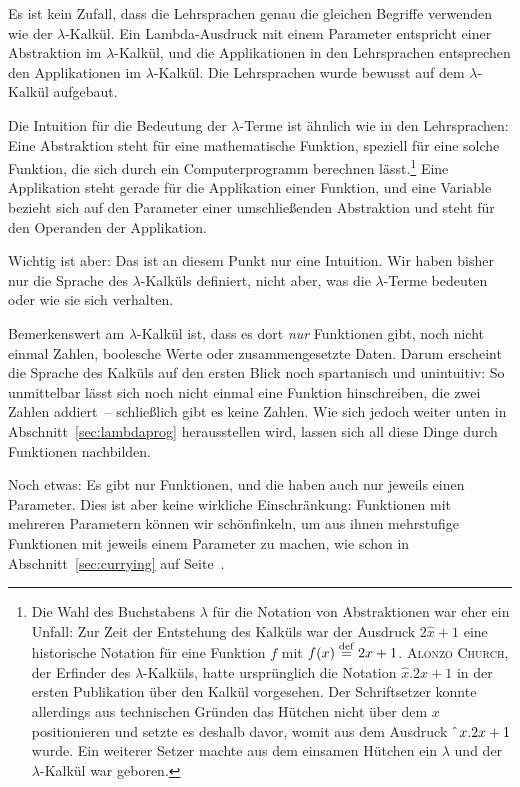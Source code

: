 Es ist kein Zufall, dass die Lehrsprachen genau die gleichen Begriffe verwenden
wie der $\lambda$-Kalkül.  Ein Lambda-Ausdruck mit einem
Parameter entspricht einer Abstraktion im $\lambda$-Kalkül,
und die Applikationen in den Lehrsprachen entsprechen den Applikationen im
$\lambda$-Kalkül.  Die Lehrsprachen wurde bewusst auf dem
$\lambda$-Kalkül aufgebaut.

Die Intuition für die Bedeutung der $\lambda$-Terme ist ähnlich wie in
den Lehrsprachen: Eine Abstraktion steht für eine mathematische Funktion,
speziell für eine solche Funktion, die sich durch ein Computerprogramm
berechnen lässt.\footnote{Die Wahl des Buchstabens $\lambda$ für die
  Notation von Abstraktionen war eher ein Unfall: Zur Zeit der
  Entstehung des Kalküls war der Ausdruck $2\hat{x}+1$ eine historische Notation für eine
  Funktion $f$ mit $f(x)\stackrel{\rm def}{=}{}2x+1$.  \textsc{Alonzo Church},
  der Erfinder des $\lambda$-Kalküls, hatte ursprünglich
  die Notation $\hat{x}.2x+1$ in der ersten Publikation über den
  Kalkül vorgesehen.  Der Schriftsetzer konnte allerdings aus
  technischen Gründen
  das Hütchen nicht über dem $x$ positionieren und setzte es deshalb
  davor, womit aus dem Ausdruck $\hat{~}\thinspace{}x.2x+1$ wurde.  Ein weiterer
  Setzer machte aus dem einsamen Hütchen ein $\lambda$ und der
  $\lambda$-Kalkül war geboren.}  Eine Applikation steht gerade für
die Applikation einer Funktion, und eine Variable bezieht sich auf den
Parameter einer umschließenden Abstraktion und steht für den Operanden
der Applikation.  

Wichtig ist aber: Das ist an diesem Punkt nur eine Intuition.  Wir
haben bisher nur die Sprache des $\lambda$-Kalküls definiert, nicht
aber, was die $\lambda$-Terme bedeuten oder wie sie sich verhalten.

Bemerkenswert am $\lambda$-Kalkül ist, dass es dort \emph{nur}
Funktionen gibt, noch nicht einmal Zahlen, boolesche Werte oder
zusammengesetzte Daten.  Darum erscheint die Sprache des Kalküls auf den
ersten Blick noch spartanisch und unintuitiv: So unmittelbar lässt sich
noch nicht einmal eine Funktion hinschreiben, die zwei Zahlen addiert~--
schließlich gibt es keine Zahlen.  Wie sich jedoch weiter unten in
Abschnitt~\ref{sec:lambdaprog} herausstellen wird, lassen sich all diese
Dinge durch Funktionen nachbilden.

Noch etwas: Es gibt nur Funktionen, und die haben auch nur jeweils
einen Parameter.  Dies ist aber keine wirkliche Einschränkung:
Funktionen mit mehreren Parametern können wir
schönfinkeln, um aus ihnen mehrstufige
Funktionen mit jeweils einem Parameter zu machen, wie schon in
Abschnitt~\ref{sec:currying} auf Seite~\pageref{sec:currying}.

